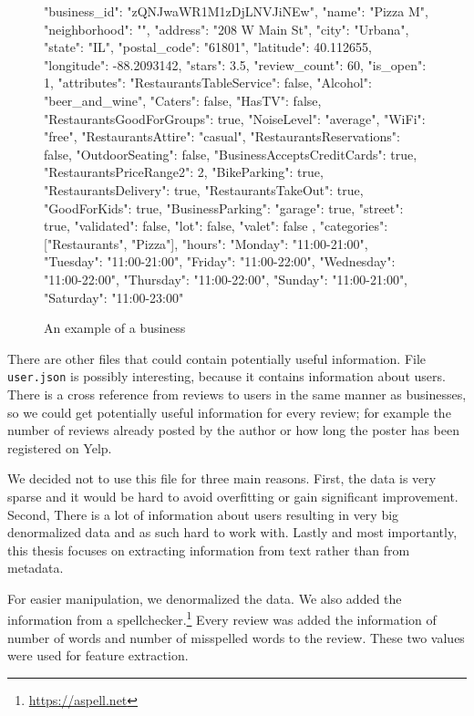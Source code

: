 \begin{figure}[t]\centering
\begin{code}
{
	"business_id": "zQNJwaWR1M1zDjLNVJiNEw",
	"name": "Pizza M",
	"neighborhood": "",
	"address": "208 W Main St",
	"city": "Urbana",
	"state": "IL",
	"postal_code": "61801",
	"latitude": 40.112655,
	"longitude": -88.2093142,
	"stars": 3.5,
	"review_count": 60,
	"is_open": 1,
	"attributes": {
		"RestaurantsTableService": false,
		"Alcohol": "beer_and_wine",
		"Caters": false,
		"HasTV": false,
		"RestaurantsGoodForGroups": true,
		"NoiseLevel": "average",
		"WiFi": "free",
		"RestaurantsAttire": "casual",
		"RestaurantsReservations": false,
		"OutdoorSeating": false,
		"BusinessAcceptsCreditCards": true,
		"RestaurantsPriceRange2": 2,
		"BikeParking": true,
		"RestaurantsDelivery": true,
		"RestaurantsTakeOut": true,
		"GoodForKids": true,
		"BusinessParking": {
			"garage": true,
			"street": true,
			"validated": false,
			"lot": false,
			"valet": false
		}
	},
	"categories": ["Restaurants", "Pizza"],
	"hours": {
		"Monday": "11:00-21:00",
		"Tuesday": "11:00-21:00",
		"Friday": "11:00-22:00",
		"Wednesday": "11:00-22:00",
		"Thursday": "11:00-22:00",
		"Sunday": "11:00-21:00",
		"Saturday": "11:00-23:00"
	}
}
\end{code}
\caption{An example of a business}\label{fig:business}
\end{figure}

There are other files that could contain potentially useful information.
File \texttt{user.json} is possibly interesting, because it contains information about users.
There is a cross reference from reviews to users in the same manner as businesses,
so we could get potentially useful information for every review;
for example the number of reviews already posted by the author or
how long the poster has been registered on Yelp.

We decided not to use this file for three main reasons.
First, the data is very sparse and it would be hard to avoid overfitting or gain significant improvement.
Second, There is a lot of information about users resulting in very big denormalized data
and as such hard to work with.
Lastly and most importantly, this thesis focuses on extracting information from text rather than from metadata.

For easier manipulation, we denormalized the data.
We also added the information from a spellchecker.\footnote{\url{https://aspell.net}}
Every review was added the information of number of words and number of misspelled words to the review.
These two values were used for feature extraction.

